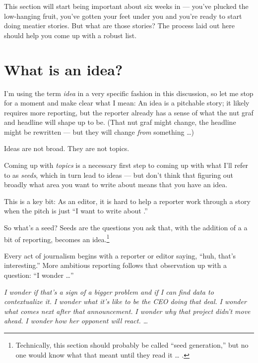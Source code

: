 \documentclass[
  11pt,
  american,
  letterpaperpaper,
  extrafontsizes,onecolumn,openright
  ]{memoir}
\begin{document}
\leavevmode{}%
\begin{greybox}[frametitle=Onboarding Path]
This section will start being important about six weeks in --- you've plucked the low-hanging fruit, you've gotten your feet under you and you're ready to start doing meatier stories. But what are those stories? The process laid out here should help you come up with a robust list.

\end{greybox}

\hypertarget{what-is-an-idea}{%
\section*{What is an idea?}\label{what-is-an-idea}}

I'm using the term \emph{idea} in a very specific fashion in this discussion, so let me stop for a moment and make clear what I mean: An idea is a pitchable story; it likely requires more reporting, but the reporter already has a sense of what the nut graf and headline will shape up to be. (That nut graf might change, the headline might be rewritten --- but they will change \emph{from} something \ldots)

Ideas are not broad. They are not topics.

Coming up with \emph{topics} is a necessary first step to coming up with what I'll refer to as \emph{seeds}, which in turn lead to ideas --- but don't think that figuring out broadly what area you want to write about means that you have an idea.

This is a key bit: As an editor, it is hard to help a reporter work through a story when the pitch is just \enquote{I want to write about .}

So what's a seed? Seeds are the questions you ask that, with the addition of a a bit of reporting, becomes an idea.\footnote{Technically, this section should probably be called \enquote{seed generation,} but no one would know what that meant until they read it \ldots{} .}

Every act of journalism begins with a reporter or editor saying, \enquote{huh, that's interesting.} More ambitious reporting follows that observation up with a question: \enquote{I wonder \ldots{}}

\emph{I wonder if that's a sign of a bigger problem and if I can find data to contextualize it.} \emph{I wonder what it's like to be the CEO doing that deal.} \emph{I wonder what comes next after that announcement.} \emph{I wonder why that project didn't move ahead.} \emph{I wonder how her opponent will react.} \emph{\ldots{}}
\end{document}
